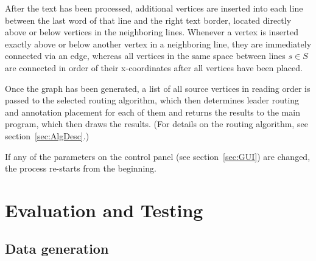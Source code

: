 \documentclass[11pt,a4paper]{vutinfth}
\begin{document}
After the text has been processed, additional vertices are inserted into each line between the last word of that line and the right text border, located directly above or below vertices in the neighboring lines. Whenever a vertex is inserted exactly above or below another vertex in a neighboring line, they are immediately connected via an edge, whereas all vertices in the same space between lines $s \in S$ are connected in order of their x-coordinates after all vertices have been placed.

Once the graph has been generated, a list of all source vertices in reading order is passed to the selected routing algorithm, which then determines leader routing and annotation placement for each of them and returns the results to the main program, which then draws the results. (For details on the routing algorithm, see section~\ref*{sec:AlgDesc}.)

If any of the parameters on the control panel (see section~\ref*{sec:GUI}) are changed, the process re-starts from the beginning.







\chapter{Evaluation and Testing}

\section{Data generation} 
\end{document}
